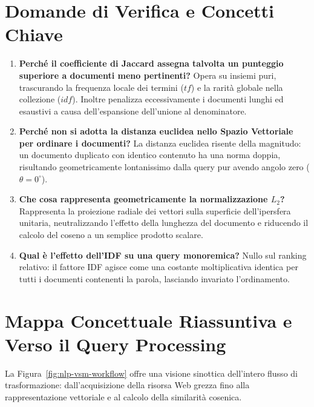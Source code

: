 \FloatBarrier
\section{Domande di Verifica e Concetti Chiave}
\label{sec:domande-verifica}

\begin{enumerate}
    \item \textbf{Perch\'e il coefficiente di Jaccard assegna talvolta un punteggio superiore a documenti meno pertinenti?}
    Opera su insiemi puri, trascurando la frequenza locale dei termini ($tf$) e la rarit\`a globale nella collezione ($idf$). Inoltre penalizza eccessivamente i documenti lunghi ed esaustivi a causa dell'espansione dell'unione al denominatore.
    \item \textbf{Perch\'e non si adotta la distanza euclidea nello Spazio Vettoriale per ordinare i documenti?}
    La distanza euclidea risente della magnitudo: un documento duplicato con identico contenuto ha una norma doppia, risultando geometricamente lontanissimo dalla query pur avendo angolo zero ($\theta = 0^\circ$).
    \item \textbf{Che cosa rappresenta geometricamente la normalizzazione $L_2$?}
    Rappresenta la proiezione radiale dei vettori sulla superficie dell'ipersfera unitaria, neutralizzando l'effetto della lunghezza del documento e riducendo il calcolo del coseno a un semplice prodotto scalare.
    \item \textbf{Qual \`e l'effetto dell'IDF su una query monoremica?}
    Nullo sul ranking relativo: il fattore IDF agisce come una costante moltiplicativa identica per tutti i documenti contenenti la parola, lasciando invariato l'ordinamento.
\end{enumerate}

\FloatBarrier
\section{Mappa Concettuale Riassuntiva e Verso il Query Processing}
\label{sec:mappa-concettuale-vsm}

La Figura~\ref{fig:nlp-vsm-workflow} offre una visione sinottica dell'intero flusso di trasformazione: dall'acquisizione della risorsa Web grezza fino alla rappresentazione vettoriale e al calcolo della similarit\`a cosenica.

